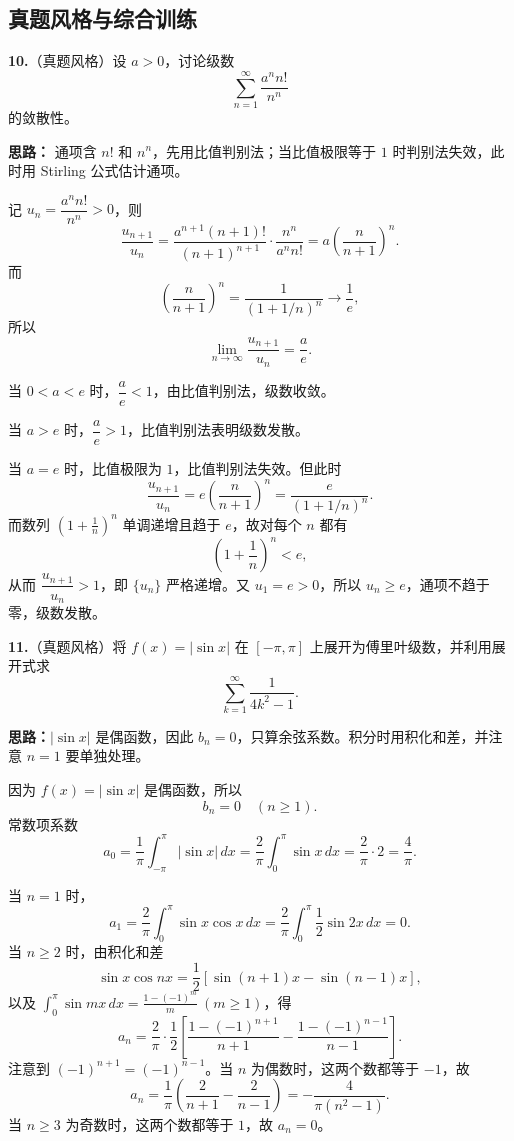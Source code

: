 \else \answerarea[10] \fi%

\subsection{真题风格与综合训练}

\textbf{10.}（真题风格）设 $a>0$，讨论级数
\[
\sum_{n=1}^{\infty}\frac{a^n n!}{n^n}
\]
的敛散性。

\ifshowsolutions%
\textbf{思路：} 通项含 $n!$ 和 $n^n$，先用比值判别法；当比值极限等于 $1$ 时判别法失效，此时用 Stirling 公式估计通项。

记 $u_n=\dfrac{a^n n!}{n^n}>0$，则
\[
\frac{u_{n+1}}{u_n}
=\frac{a^{n+1}(n+1)!}{(n+1)^{n+1}}\cdot\frac{n^n}{a^n n!}
=a\left(\frac{n}{n+1}\right)^n.
\]
而
\[
\left(\frac{n}{n+1}\right)^n
=\frac{1}{(1+1/n)^n}\longrightarrow\frac1e,
\]
所以
\[
\lim_{n\to\infty}\frac{u_{n+1}}{u_n}=\frac ae.
\]

当 $0<a<e$ 时，$\dfrac ae<1$，由比值判别法，级数收敛。

当 $a>e$ 时，$\dfrac ae>1$，比值判别法表明级数发散。

当 $a=e$ 时，比值极限为 $1$，比值判别法失效。但此时
\[
\frac{u_{n+1}}{u_n}
=e\left(\frac{n}{n+1}\right)^n
=\frac{e}{(1+1/n)^n}.
\]
而数列 $\left(1+\frac1n\right)^n$ 单调递增且趋于 $e$，故对每个 $n$ 都有
\[
\left(1+\frac1n\right)^n<e,
\]
从而 $\dfrac{u_{n+1}}{u_n}>1$，即 $\{u_n\}$ 严格递增。又 $u_1=e>0$，所以 $u_n\ge e$，通项不趋于零，级数发散。

\else \answerarea[10] \fi%

\textbf{11.}（真题风格）将 $f(x)=|\sin x|$ 在 $[-\pi,\pi]$ 上展开为傅里叶级数，并利用展开式求
\[
\sum_{k=1}^{\infty}\frac{1}{4k^2-1}.
\]

\ifshowsolutions%
\textbf{思路：}$|\sin x|$ 是偶函数，因此 $b_n=0$，只算余弦系数。积分时用积化和差，并注意 $n=1$ 要单独处理。

因为 $f(x)=|\sin x|$ 是偶函数，所以
\[
b_n=0\quad(n\ge1).
\]
常数项系数
\[
a_0=\frac1\pi\int_{-\pi}^{\pi}|\sin x|\,dx
=\frac2\pi\int_0^{\pi}\sin x\,dx
=\frac2\pi\cdot2=\frac4\pi.
\]

当 $n=1$ 时，
\[
a_1=\frac2\pi\int_0^{\pi}\sin x\cos x\,dx
=\frac2\pi\int_0^{\pi}\frac12\sin2x\,dx=0.
\]
当 $n\ge2$ 时，由积化和差
\[
\sin x\cos nx=\frac12\left[\sin(n+1)x-\sin(n-1)x\right],
\]
以及 $\displaystyle\int_0^{\pi}\sin mx\,dx=\frac{1-(-1)^m}{m}\ (m\ge1)$，得
\[
a_n=\frac2\pi\cdot\frac12
\left[
\frac{1-(-1)^{n+1}}{n+1}
-\frac{1-(-1)^{n-1}}{n-1}
\right].
\]
注意到 $(-1)^{n+1}=(-1)^{n-1}$。当 $n$ 为偶数时，这两个数都等于 $-1$，故
\[
a_n=\frac1\pi\left(\frac{2}{n+1}-\frac{2}{n-1}\right)
=-\frac{4}{\pi(n^2-1)}.
\]
当 $n\ge3$ 为奇数时，这两个数都等于 $1$，故 $a_n=0$。

